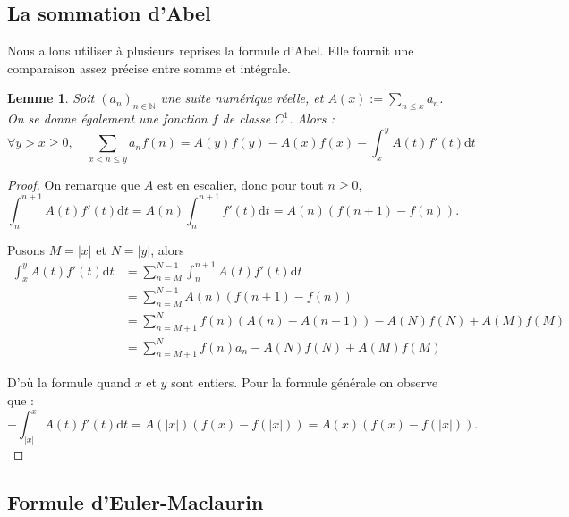 \documentclass[french]{report}
\newtheorem{lemma}[theorem]{Lemme}
\begin{document}
\subsection{La sommation d'Abel}

Nous allons utiliser à plusieurs reprises la formule d'Abel. Elle fournit une comparaison assez précise entre somme et intégrale.

\begin{lemma}\label{lem:formule-abel}
  Soit $(a_n)_{n\in\mathbb{N}}$ une suite numérique réelle, et $A(x):=\sum_{n\leq x}a_n$. On se donne également une fonction $f$ de classe $C^1$. Alors :
  \[ \forall y>x\geq0,\quad
  \sum_{x<n\leq y} a_n f(n)
  = A(y)f(y) - A(x)f(x)
  - \int_x^yA(t)f'(t)\mathrm{d}t
  \]
\end{lemma}

\begin{proof}
  On remarque que $A$ est en escalier, donc pour tout $n\geq0$,
  \[ \int_n^{n+1}A(t)f'(t)\mathrm{d}t
  = A(n)\int_n^{n+1}f'(t)\mathrm{d}t
  = A(n)(f(n+1)-f(n)).
  \]

  Posons $M=|x|$ et $N=|y|$, alors
  \begin{align*}
    \int_x^yA(t)f'(t)\mathrm{d}t
    &= \sum_{n=M}^{N-1}\int_n^{n+1}A(t)f'(t)\mathrm{d}t \\
    &= \sum_{n=M}^{N-1}A(n)(f(n+1)-f(n)) \\
    &= \sum_{n=M+1}^Nf(n)(A(n)-A(n-1))-A(N)f(N)+A(M)f(M) \\
    &= \sum_{n=M+1}^Nf(n)a_n-A(N)f(N)+A(M)f(M)
  \end{align*}

  D'où la formule quand $x$ et $y$ sont entiers. Pour la formule générale on observe que :
  \[ -\int_{|x|}^xA(t)f'(t)\mathrm{d}t = A(|x|)(f(x)-f(|x|)) = A(x)(f(x)-f(|x|)). \]
  
\end{proof}

\subsection{Formule d'Euler-Maclaurin}
\end{document}
